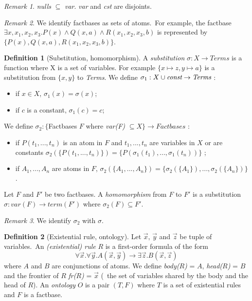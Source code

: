\documentclass{article}
\theoremstyle{definition}
\newtheorem{definition}{Definition}[section]
\theoremstyle{remark}
\newtheorem{remark}{Remark}[section]
\begin{document}
\begin{remark} 
\emph{nulls} $\subseteq$ \emph{var}. \emph{var} and \emph{cst} are disjoints.
\end{remark}

\begin{remark} We identify factbases as sets of atoms.\ For example, the factbase $\exists x,x_{1},x_{2},x_{3}. P(x) \land Q(x,a) \land R(x_{1},x_{2},x_{3},b)$ is represented by
$\{P(x),Q(x,a),R(x_{1},x_{2},x_{3},b)\}$.
\end{remark}

\begin{definition}[Substitution, homomorphism]
A \emph{substitution} $\sigma:X \to \textit{Terms}$ is a function where X is a set of variables. For example $\{x \mapsto z, y \mapsto a \}$ is a substitution from $\{x,y\}$ to \textit{Terms}. We define $\sigma_1:X \cup \emph{const} \to \textit{Terms}$ :
\begin{itemize}
\item if $x \in X$, $\sigma_1(x) = \sigma(x)$;
\item if $c$ is a constant, $\sigma_1(c) = c$;
\end{itemize}
We define $\sigma_2:\{$Factbases $F$ where \emph{var(F)} $\subseteq X\} \to \textit{Factbases}$ :
\begin{itemize}
\item if $P(t_{1},...,t_{n})$ is an atom in $F$ and $t_1,...,t_n$ are variables in $X$ or are constants $\sigma_2(\{P(t_{1},...,t_{n})\}) = \{P(\sigma_1(t_{1}),...,\sigma_1(t_{n}))\}$ ;
\item if $A_{1},...,A_{n}$ are atoms in $F$, $\sigma_2(\{A_{1},...,A_{n}\}) = \{\sigma_2(\{A_{1}\}),...,\sigma_2(\{A_{n}\})\}$.
\end{itemize}
Let $F$ and $F'$ be two factbases. A \emph{homomorphism} from $F$ to $F'$ is a substitution $\sigma:var(F) \to term(F')$ where $\sigma_2(F) \subseteq F'$.
\end{definition}

\begin{remark}
We identify $\sigma_2$ with $\sigma$.
\end{remark}

\begin{definition}[Existential rule, ontology]
Let $\vec x$, $\vec y$ and $\vec z$ be tuple of variables.\ An \emph{(existential) rule} $R$ is a first-order formula	of the form $$\forall \vec x.\forall \vec y. A(\vec x,\vec y) \rightarrow \exists \vec z. B(\vec x,\vec z)$$ where $A$ and $B$ are conjunctions of atoms. We define \emph{body($R$)} = $A$, \emph{head($R$)} = $B$ and the frontier of $R$ \emph{fr($R$)} = $\vec x$ (\ the set of variables shared by the body and the head of $R$). An \emph{ontology} $O$ is a pair $(T,F)$ where $T$ is a set of existential rules and $F$ is a factbase.
\end{definition}
\end{document}
